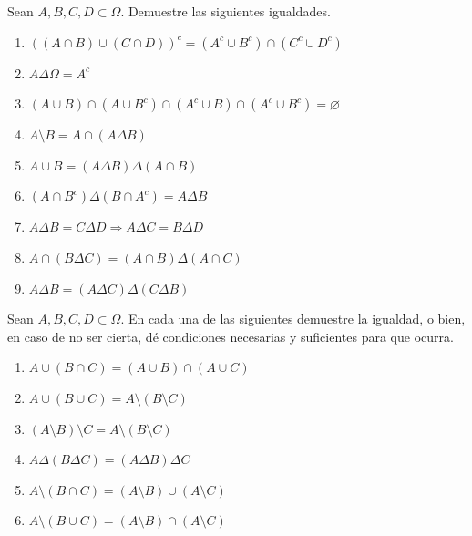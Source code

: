 \documentclass[12pt,a4paper]{article}
\begin{document}
    \begin{mdframed}[style=mdbluebox,frametitle={Ejercicio 2}]
        Sean $A, B, C, D \subset \Omega$. Demuestre las siguientes igualdades.
        \begin{enumerate}[label=(\alph*)]
            \item $((A \cap B) \cup (C \cap D))^c = (A^c \cup B^c) \cap (C^c \cup D^c)$
            \item $A \Delta \Omega = A^c$
            \item $(A \cup B) \cap (A \cup B^c) \cap (A^c \cup B) \cap (A^c \cup B^c) = \varnothing$
            \item $A \setminus B = A \cap (A \Delta B)$
            \item $A \cup B = (A \Delta B) \Delta (A \cap B)$
            \item $(A \cap B^c) \Delta (B \cap A^c) = A \Delta B$
            \item $A \Delta B = C \Delta D \Rightarrow A \Delta C = B \Delta D$
            \item $A \cap (B \Delta C) = (A \cap B) \Delta (A \cap C)$
            \item $A \Delta B = (A \Delta C) \Delta (C \Delta B)$
        \end{enumerate}
    \end{mdframed}

    \begin{mdframed}[style=mdbluebox,frametitle={Ejercicio 3}]
        Sean $A, B, C, D \subset \Omega$. En cada una de las siguientes demuestre la igualdad, o bien, en caso de no ser cierta, dé condiciones necesarias y suficientes para que ocurra.
        \begin{enumerate}[label=(\alph*)]
            \item $A \cup (B \cap C) = (A \cup B) \cap (A \cup C)$
            \item $A \cup (B \cup C) = A \setminus (B \setminus C)$
            \item $(A \setminus B) \setminus C = A \setminus (B \setminus C)$
            \item $A \Delta (B \Delta C) = (A \Delta B) \Delta C$
            \item $A \setminus (B \cap C) = (A \setminus B) \cup (A \setminus C)$
            \item $A \setminus (B \cup C) = (A \setminus B) \cap (A \setminus C)$
        \end{enumerate}
    \end{mdframed}
\end{document}
